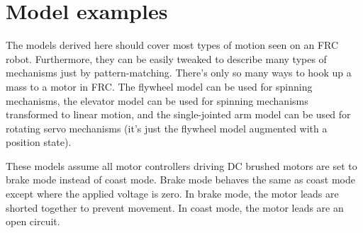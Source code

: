 
\chapter{Model examples}

The \glspl{model} derived here should cover most types of motion seen on an FRC
robot. Furthermore, they can be easily tweaked to describe many types of
mechanisms just by pattern-matching. There's only so many ways to hook up a mass
to a motor in FRC. The flywheel \gls{model} can be used for spinning mechanisms,
the elevator \gls{model} can be used for spinning mechanisms transformed to
linear motion, and the single-jointed arm \gls{model} can be used for rotating
servo mechanisms (it's just the flywheel \gls{model} augmented with a position
\gls{state}).

These \glspl{model} assume all motor controllers driving DC brushed motors are
set to brake mode instead of coast mode. Brake mode behaves the same as coast
mode except where the applied voltage is zero. In brake mode, the motor leads
are shorted together to prevent movement. In coast mode, the motor leads are an
open circuit.

\renewcommand*{\chapterpath}{\partpath/model-examples}







